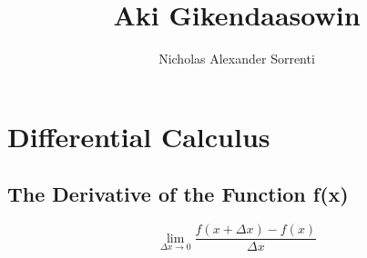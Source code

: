 \documentclass[a4paper,11pt]{book}
\title{Aki Gikendaasowin}
\author{Nicholas Alexander Sorrenti}
\begin{document}
\maketitle
\tableofcontents

\chapter{Differential Calculus}
\section{The Derivative of the Function f(x)}
\[ \lim_{\Delta x \to 0} \frac{f(x + \Delta x) - f(x)}{\Delta x} \]
\end{document}
